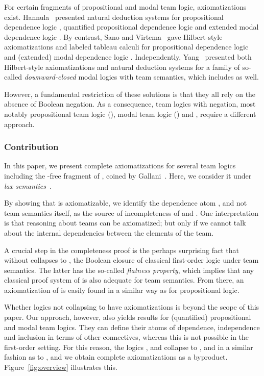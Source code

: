 \documentclass[a4paper,english,fleqn,11pt,final]{scrartcl}
\theoremstyle{plain}
\theoremstyle{definition}
\begin{document}
\smallskip

For certain fragments of propositional and modal team logic, axiomatizations exist.
Hannula~\cite{Hannula16} presented natural deduction systems for propositional dependence logic , quantified propositional dependence logic  and extended modal dependence logic .
By contrast, Sano and Virtema~\cite{sano_et_al} gave Hilbert-style axiomatizations and labeled tableau calculi for propositional dependence logic  and (extended) modal dependence logic .
Independently, Yang~\cite{Yang17} presented both Hilbert-style axiomatizations and natural deduction systems for a family of so-called \emph{downward-closed} modal logics with team semantics, which includes  as well.

However, a fundamental restriction of these solutions is that they all rely on the absence of Boolean negation.
As a consequence, team logics with negation, most notably propositional team logic (), modal team logic () and , require a different approach.

\smallskip

\subsubsection*{Contribution}

In this paper, we present complete axiomatizations for several team logics including the -free fragment of , coined  by Gallani~\cite{Galliani14}.
Here, we consider it under \emph{lax semantics}~\cite{galliani_inclusion_2012}.

By showing that  is axiomatizable, we identify the dependence atom , and not team semantics itself, as the source of incompleteness of  and .
One interpretation is that reasoning about teams can be axiomatized; but only if we cannot talk about the internal dependencies between the elements of the team.

A crucial step in the completeness proof is the perhaps surprising fact that  without  collapses to , the Boolean closure of classical first-order logic  under team semantics.
The latter has the so-called \emph{flatness property}, which implies that any classical proof system of  is also adequate for team semantics.
From there, an axiomatization of  is easily found in a similar way as for propositional logic.

Whether logics not collapsing to  have axiomatizations is beyond the scope of this paper.
Our approach, however, also yields results for (quantified) propositional and modal team logics.
They can define their atoms of dependence, independence and inclusion in terms of other connectives, whereas this is not possible in the first-order setting.
For this reason, the logics ,  and  collapse to ,  and  in a similar fashion as  to , and we obtain complete axiomatizations as a byproduct.
Figure~\ref{fig:overview} illustrates this.
\end{document}
